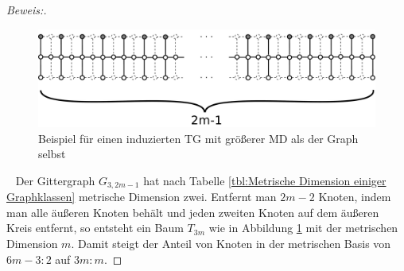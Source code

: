 \vspace{-6mm}
\begin{proof}[Beweis:]$\;$
\begin{figure}[h!]
		\centering 		 
\includegraphics[width=420pt]{bilder/gitterzubaumlsch.pdf}
   \caption{Beispiel für einen induzierten TG mit größerer MD als der Graph selbst}
   \label{bild:Gitterbaum2}
  	 \end{figure}
~ \linebreak
Der Gittergraph $G_{3,2m-1}$ hat nach Tabelle \ref{tbl:Metrische Dimension einiger Graphklassen} metrische Dimension zwei. Entfernt man $2m-2$ Knoten, indem man alle äußeren Knoten behält und jeden zweiten Knoten auf dem äußeren Kreis entfernt, so entsteht ein Baum $T_{3m}$ wie in Abbildung \ref{bild:Gitterbaum2} mit der metrischen Dimension $m$. Damit steigt der Anteil von Knoten in der metrischen Basis von $6m-3:2$ auf $3m:m$.
\end{proof}

